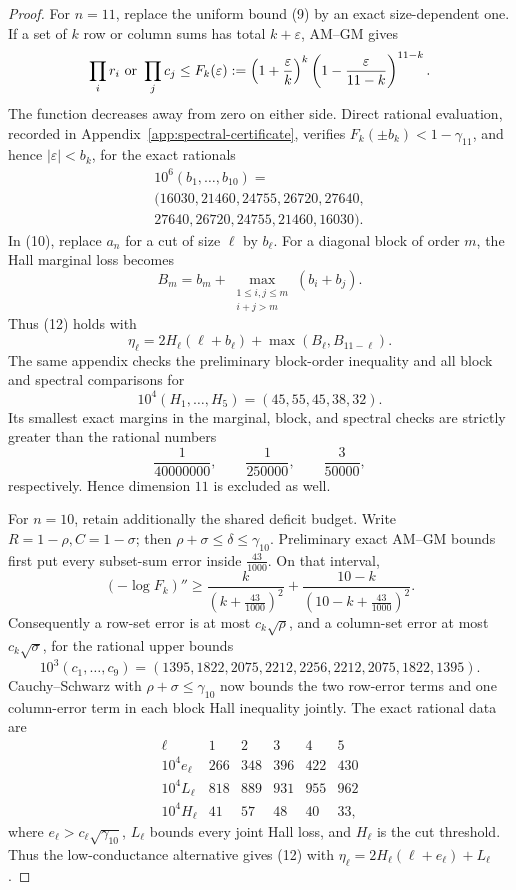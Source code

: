 \documentclass[11pt]{amsart}
\theoremstyle{definition}
\theoremstyle{remark}
\newenvironment{exacttable}
  {\begingroup\small
   \setlength{\arraycolsep}{4pt}%
   \renewcommand{\arraystretch}{1.12}}
  {\endgroup}
\begin{document}
\begin{proof}
For \(n=11\), replace the uniform bound (9) by an exact size-dependent one.
If a set of \(k\) row or column sums has total \(k+\varepsilon\), AM--GM
gives
\[
\prod_i r_i\ \hbox{or}\ \prod_jc_j
\leq F_k(\varepsilon):=
\left(1+\frac{\varepsilon}{k}\right)^k
\left(1-\frac{\varepsilon}{11-k}\right)^{11-k}.
\]
The function decreases away from zero on either side.  Direct rational
evaluation, recorded in Appendix~\ref{app:spectral-certificate}, verifies
\(F_k(\pm b_k)<1-\gamma_{11}\), and hence
\(|\varepsilon|<b_k\), for the exact rationals
\[
\begin{gathered}
10^6(b_1,\ldots,b_{10})={}\\
(16030,21460,24755,26720,27640,\\
 27640,26720,24755,21460,16030).
\end{gathered}
\]
In (10), replace \(a_n\) for a cut of size \(\ell\) by \(b_\ell\). For a
diagonal block of order \(m\), the Hall marginal loss becomes
\[
B_m=b_m+\max_{\substack{1\leq i,j\leq m\\i+j>m}}(b_i+b_j).
\]
Thus (12) holds with
\[
\eta_\ell=2H_\ell(\ell+b_\ell)+\max(B_\ell,B_{11-\ell}).
\]
The same appendix checks the preliminary block-order inequality and all
block and spectral comparisons for
\[
10^4(H_1,\ldots,H_5)=(45,55,45,38,32).
\]
Its smallest exact margins in the marginal, block, and spectral checks are
strictly greater than the rational numbers
\[
\frac1{40000000},\qquad \frac1{250000},\qquad \frac3{50000},
\]
respectively. Hence dimension \(11\) is excluded as well.

For \(n=10\), retain additionally the shared deficit budget. Write
\(R=1-\rho,C=1-\sigma\); then
\(\rho+\sigma\leq\delta\leq\gamma_{10}\). Preliminary exact AM--GM bounds
first put every subset-sum error inside \(\frac{43}{1000}\). On that
interval,
\[
(-\log F_k)''\geq
\frac{k}{(k+\frac{43}{1000})^2}+
\frac{10-k}{(10-k+\frac{43}{1000})^2}.
\]
Consequently a row-set error is at most \(c_k\sqrt\rho\), and a column-set
error at most \(c_k\sqrt\sigma\), for the rational upper bounds
\[
10^3(c_1,\ldots,c_9)
=(1395,1822,2075,2212,2256,2212,2075,1822,1395).
\]
Cauchy--Schwarz with \(\rho+\sigma\leq\gamma_{10}\) now bounds the two
row-error terms and one column-error term in each block Hall inequality
jointly.  The exact rational data are
\begin{exacttable}
\[
\begin{array}{c|ccccc}
\ell&1&2&3&4&5\\\hline
10^4e_\ell&266&348&396&422&430\\
10^4L_\ell&818&889&931&955&962\\
10^4H_\ell&41&57&48&40&33 ,
\end{array}
\]
\end{exacttable}
where \(e_\ell>c_\ell\sqrt{\gamma_{10}}\), \(L_\ell\) bounds every joint
Hall loss, and \(H_\ell\) is the cut threshold. Thus the low-conductance
alternative gives (12) with
\(\eta_\ell=2H_\ell(\ell+e_\ell)+L_\ell\).


\end{proof}
\end{document}

